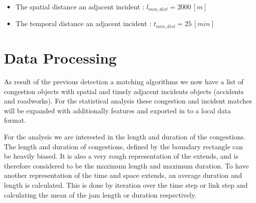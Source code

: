 \begin{itemize}
	\item The spatial distance an adjacent incident : $l_{min,dist} = 2000 \,[m]$
	\item The temporal distance an adjacent incident : $t_{min,dist} = 25 \,[min]$
\end{itemize}

\section{Data Processing}
\label{methodology_data_processing}
As result of the previous detection a matching algorithms we now have a list of congestion objects with spatial and timely adjacent incidents objects (accidents and roadworks). For the statistical analysis these congestion and incident matches will be expanded with additionally features and exported in to a local data format.

For the analysis we are interested in the length and duration of the congestions. The length and duration of congestions, defined by the boundary rectangle can be heavily biased. It is also a very rough representation of the extends, and is therefore considered to be the maximum length and maximum duration. To have another representation of the time and space extends, an average duration and length is calculated. This is done by iteration over the time step or link step and calculating the mean of the jam length or duration respectively.

